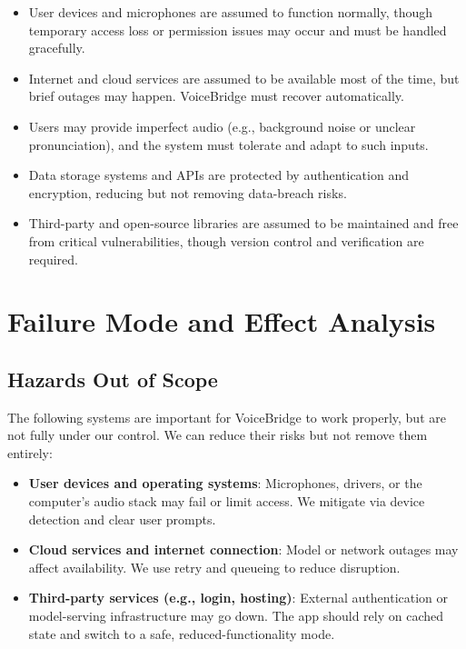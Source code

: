 \documentclass{article}
\begin{document}
\begin{itemize}
    \item User devices and microphones are assumed to function normally, though temporary access loss or permission issues may occur and must be handled gracefully.
    
    \item Internet and cloud services are assumed to be available most of the time, but brief outages may happen. VoiceBridge must recover automatically.
    
    \item Users may provide imperfect audio (e.g., background noise or unclear pronunciation), and the system must tolerate and adapt to such inputs.
    
    \item Data storage systems and APIs are protected by authentication and encryption, reducing but not removing data-breach risks.
    
    \item Third-party and open-source libraries are assumed to be maintained and free from critical vulnerabilities, though version control and verification are required.
\end{itemize}


\section{Failure Mode and Effect Analysis}

\subsection{Hazards Out of Scope}

The following systems are important for VoiceBridge to work properly, but are not fully under our control. We can reduce their risks but not remove them entirely:

\begin{itemize}
    \item \textbf{User devices and operating systems}: Microphones, drivers, or the computer's audio stack may fail or limit access. We mitigate via device detection and clear user prompts.
    \item \textbf{Cloud services and internet connection}: Model or network outages may affect availability. We use retry and queueing to reduce disruption.
    \item \textbf{Third-party services (e.g., login, hosting)}: External authentication or model-serving infrastructure may go down. The app should rely on cached state and switch to a safe, reduced-functionality mode.
\end{itemize}
\end{document}
